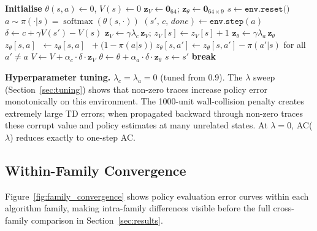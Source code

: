 \documentclass[11pt]{article}
\begin{document}
\begin{algorithm}[H]
\caption{Actor-Critic with Eligibility Traces AC($\lambda$)}
\label{alg:ac_lambda}
\begin{algorithmic}[1]
\State \textbf{Initialise} $\theta(s,a)\leftarrow 0$,\; $V(s)\leftarrow 0$
    \State $\mathbf{z}_V \leftarrow \mathbf{0}_{64}$;\;
           $\mathbf{z}_\theta \leftarrow \mathbf{0}_{64\times 9}$ 
    \State $s \leftarrow \texttt{env.reset()}$
        \State $a \sim \pi(\cdot|s) = \operatorname{softmax}(\theta(s,\cdot))$
        \State $(s',\, c,\, \textit{done}) \leftarrow \texttt{env.step}(a)$
        \State $\delta \leftarrow c + \gamma V(s') - V(s)$
        \State $\mathbf{z}_V \leftarrow \gamma\lambda_c\,\mathbf{z}_V$;\;
               $z_V[s] \leftarrow z_V[s] + 1$ 
        \State $\mathbf{z}_\theta \leftarrow \gamma\lambda_a\,\mathbf{z}_\theta$
        \State $z_\theta[s,a]\;\; \leftarrow z_\theta[s,a]\;\; + \bigl(1-\pi(a|s)\bigr)$
        \State $z_\theta[s,a'] \leftarrow z_\theta[s,a'] - \pi(a'|s)$
               \hfill for all $a'\neq a$
        \State $V \leftarrow V + \alpha_c\cdot\delta\cdot\mathbf{z}_V$ 
        \State $\theta \leftarrow \theta + \alpha_a\cdot\delta\cdot\mathbf{z}_\theta$
        \State $s \leftarrow s'$
         \textbf{break} \EndIf
    \EndFor
\EndFor
\end{algorithmic}
\end{algorithm}

\textbf{Hyperparameter tuning.}  $\lambda_c = \lambda_a = 0$ (tuned from 0.9).
The $\lambda$ sweep (Section~\ref{sec:tuning}) shows that non-zero traces
increase policy error monotonically on this environment.  The 1000-unit
wall-collision penalty creates extremely large TD errors; when propagated
backward through non-zero traces these corrupt value and policy estimates at
many unrelated states.  At $\lambda=0$, AC($\lambda$) reduces exactly to
one-step AC.

\subsection{Within-Family Convergence}

Figure~\ref{fig:family_convergence} shows policy evaluation error curves
within each algorithm family, making intra-family differences visible before
the full cross-family comparison in Section~\ref{sec:results}.
\end{document}

